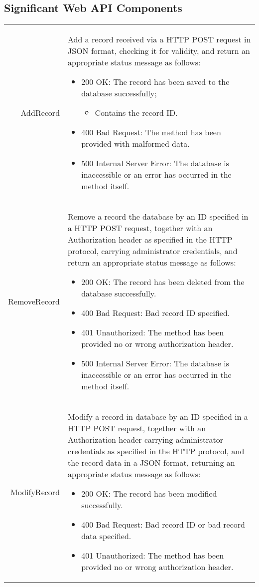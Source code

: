 \subsection{Significant Web API Components}
	\begin{longtable}{r p{10cm}}
	AddRecord & Add a record received via a HTTP POST request in JSON format, checking it for validity, and return an appropriate status message as follows:
	\begin{itemize}
		\item 200 OK: The record has been saved to the database successfully; 
		\begin{itemize}
			\item Contains the record ID.
		\end{itemize}
		\item 400 Bad Request: The method has been provided with malformed data.
		\item 500 Internal Server Error: The database is inaccessible or an error has occurred in the method itself.
	\end{itemize}\\
	RemoveRecord & Remove a record the database by an ID specified in a HTTP POST request, together with  an Authorization header as specified in the HTTP protocol, carrying administrator credentials, and return an appropriate status message as follows:
	\begin{itemize}
		\item 200 OK: The record has been deleted from the database successfully.
		\item 400 Bad Request: Bad record ID specified.
		\item 401 Unauthorized: The method has been provided no or wrong authorization header.
		\item 500 Internal Server Error: The database is inaccessible or an error has occurred in the method itself.
	\end{itemize}\\
	ModifyRecord & Modify a record in database by an ID specified in a HTTP POST request, together with an Authorization header carrying administrator credentials as specified in the HTTP protocol,  and the record data in a JSON format, returning an appropriate status message as follows:
	\begin{itemize}
		\item 200 OK: The record has been modified successfully.
		\item 400 Bad Request: Bad record ID or bad record data specified.
		\item 401 Unauthorized: The method has been provided no or wrong authorization header.

\end{itemize}
\end{longtable}
